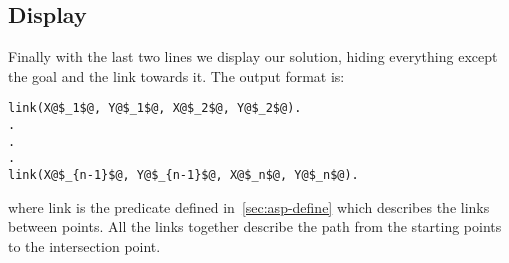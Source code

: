 \subsection{Display}

Finally with the last two lines we display our solution, hiding everything except the goal and the link towards it. The output format is:

\begin{verbatim}
link(X@$_1$@, Y@$_1$@, X@$_2$@, Y@$_2$@).
.
.
.
link(X@$_{n-1}$@, Y@$_{n-1}$@, X@$_n$@, Y@$_n$@).
\end{verbatim}

where link is the predicate defined in~\ref{sec:asp-define} which describes the links between points. All the links together describe the path from the starting points to the intersection point.
